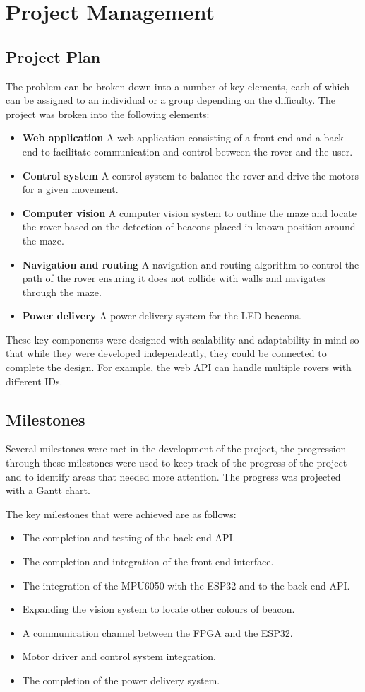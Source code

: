 \section{Project Management}
\subsection{Project Plan}
The problem can be broken down into a number of key elements, each of which can be assigned to an individual or a group depending on the difficulty.
The project was broken into the following elements:
\begin{itemize}
    \item \textbf{Web application} A web application consisting of a front end and a back end to facilitate communication and control between the rover and the user.
    \item \textbf{Control system} A control system to balance the rover and drive the motors for a given movement.
    \item \textbf{Computer vision} A computer vision system to outline the maze and locate the rover based on the detection of beacons placed in known position around the maze.
    \item \textbf{Navigation and routing} A navigation and routing algorithm to control the path of the rover ensuring it does not collide with walls and navigates through the maze.
    \item \textbf{Power delivery} A power delivery system for the LED beacons.
\end{itemize}

These key components were designed with scalability and adaptability in mind so that while they were developed independently, they could be connected to complete the design. For example, the web API can handle multiple rovers with different IDs.

\subsection{Milestones}
Several milestones were met in the development of the project, 
the progression through these milestones were used to keep track of the progress 
of the project and to identify areas that needed more attention. 
The progress was projected with a Gantt chart.

The key milestones that were achieved are as follows:
\begin{itemize}
    \item The completion and testing of the back-end API.
    \item The completion and integration of the front-end interface.
    \item The integration of the MPU6050 with the ESP32 and to the back-end API.
    \item Expanding the vision system to locate other colours of beacon.
    \item A communication channel between the FPGA and the ESP32.
    \item Motor driver and control system integration.
    \item The completion of the power delivery system.
\end{itemize}


